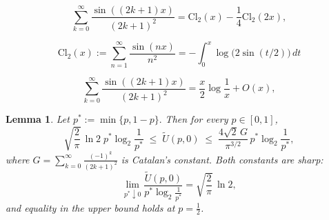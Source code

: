\documentclass[10pt,a4paper]{amsart}
\newtheorem{lemma}{Lemma}
\begin{document}
\begin{equation}
\label{eq:S(p)-rep}
\sum_{k=0}^\infty \frac{\sin((2k+1)x)}{(2k+1)^2}
=
\mathrm{Cl}_2(x)-\frac14\mathrm{Cl}_2(2x),
\end{equation}

\begin{equation}
\label{eq:cl2}
\mathrm{Cl}_2(x):=\sum_{n=1}^\infty \frac{\sin(nx)}{n^2}
=-\int_0^x \log\!\bigl(2\sin(t/2)\bigr)\,dt
\end{equation}

\begin{equation}
\label{eq:S(p)-approx}
\sum_{k=0}^\infty \frac{\sin((2k+1)x)}{(2k+1)^2}
=
\frac{x}{2}\log\frac1x+O(x),
\end{equation}

\begin{lemma}\label{lem:Utilde-sharp-constants-S2}
Let
$
p^*:=\min\{p,1-p\}.
$ Then for every $p\in[0,1]$,
\[
\sqrt{\frac2\pi}\,\ln 2 \; p^*\log_2\frac1{p^*}
\;\le\;
\tilde U(p,0)
\;\le\;
\frac{4\sqrt2\,G}{\pi^{3/2}}\,p^*\log_2\frac1{p^*},
\]
where
$
G=\sum_{k=0}^\infty \frac{(-1)^k}{(2k+1)^2}
$
is Catalan's constant.
Both constants are sharp:
\[
\lim_{p^*\downarrow0}
\frac{\tilde U(p,0)}{p^*\log_2\frac1{p^*}}
=
\sqrt{\frac2\pi}\,\ln 2,
\]
and equality in the upper bound holds at $p=\frac12$.
\end{lemma}
\end{document}
